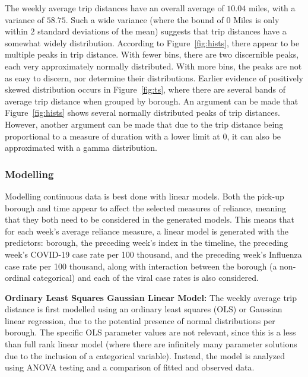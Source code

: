 \documentclass[11pt]{article}
\begin{document}
The weekly average trip distances have an overall average of $10.04$ miles, with a variance of $58.75$.
Such a wide variance (where the bound of $0$ Miles is only within $2$ standard deviations of the mean) 
suggests that trip distances have a somewhat widely distribution.
According to Figure~\ref{fig:hists}, there appear to be multiple peaks in trip distance. 
With fewer bins, there are two discernible peaks, each very approximately normally distributed.
With more bins, the peaks are not as easy to discern, nor determine their distributions.
Earlier evidence of positively skewed distribution occurs in Figure~\ref{fig:ts}, 
where there are several bands of average trip distance when grouped by borough.
An argument can be made that Figure~\ref{fig:hists} shows several normally distributed peaks of trip distances.
However, another argument can be made that due to the trip distance being proportional to a measure of duration
with a lower limit at $0$, it can also be approximated with a gamma distribution.

\subsubsection{Modelling}

Modelling continuous data is best done with linear models.
Both the pick-up borough and time appear to affect the selected measures of reliance,
meaning that they both need to be considered in the generated models.
This means that for each week's average reliance measure, 
a linear model is generated with the predictors: 
borough,
the preceding week's index in the timeline,
the preceding week's COVID-19 case rate per 100 thousand,
and
the preceding week's Influenza case rate per 100 thousand,
along with interaction between the borough (a non-ordinal categorical)
and each of the viral case rates is also considered.

\textbf{Ordinary Least Squares Gaussian Linear Model:}
The weekly average trip distance is first modelled using an ordinary least squares (OLS) or Gaussian linear regression,
due to the potential presence of normal distributions per borough.
The specific OLS parameter values are not relevant, since this is a less than full rank linear model 
(where there are infinitely many parameter solutions due to the inclusion of a categorical variable).
Instead, the model is analyzed using ANOVA testing and a comparison of fitted and observed data.
\end{document}
